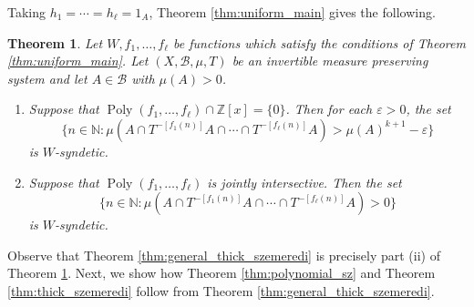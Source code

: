 \documentclass[12pt]{article}
\theoremstyle{plain} %
\theoremstyle{definition} %
\theoremstyle{plain}
\newcounter{MainTheoremCounter}
\newtheorem{maintheorem}[MainTheoremCounter]{Theorem}
\theoremstyle{plain}
\numberwithin{equation}{section}
\newcommand{\N}{\mathbb{N}}
\newcommand{\Z}{\mathbb{Z}}
\renewcommand{\epsilon}{\varepsilon}
\newcommand{\1}{\mathbbm{1}}
\newcommand{\Poly}{\operatorname{Poly}}
\newcommand{\round}[1]{[ #1 ]}
\begin{document}
Taking $h_1=\cdots = h_{\ell} = 1_{A}$, Theorem \ref{thm:uniform_main} gives the following.
\begin{maintheorem}\label{thm:W_syndetic_main}
    Let $W,f_1,\dots, f_{\ell}$ be functions which satisfy the conditions of Theorem \ref{thm:uniform_main}. Let $(X,\mathscr{B},\mu,T)$ be an invertible measure preserving system and let $A\in \mathscr{B}$ with $\mu(A)>0$.
     \begin{enumerate}[label = (\roman*)]
        \item Suppose that $\Poly(f_1,\dots, f_{\ell})\cap \Z[x] = \{0\}$. Then for each $\epsilon>0$, the set 
        \begin{equation}
            \{n\in \N:\mu(A\cap T^{-\round{f_1(n)}}A\cap\cdots \cap T^{-\round{f_{\ell}(n)}}A)>\mu(A)^{k+1}-\epsilon\}
         \end{equation}
         is $W$-syndetic.
         \item Suppose that $\Poly(f_1,\dots, f_{\ell})$ is jointly intersective.
         Then the set
        \begin{equation}
            \{n\in \N:\mu(A\cap T^{-\round{f_1(n)}}A\cap\cdots \cap T^{-\round{f_{\ell}(n)}}A)>0\}
         \end{equation}
         is $W$-syndetic.
     \end{enumerate}
\end{maintheorem}
Observe that Theorem \ref{thm:general_thick_szemeredi} is precisely part (ii) of Theorem \ref{thm:W_syndetic_main}. Next, we show how Theorem \ref{thm:polynomial_sz} and Theorem \ref{thm:thick_szemeredi} follow from Theorem \ref{thm:general_thick_szemeredi}.
\end{document}
